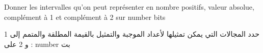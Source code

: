 Donner les intervalles qu'on peut représenter en nombre positifs, valeur absolue, complément à 1 et complément à 2  sur {{number}} bits


\begin{arab}[utf]
حدد المجالات التي يمكن تمثيلها لأعداد الموجبة والتمثيل بالقيمة المطلقة والمتمم إلى 1 و 2 على   : {{number}} بت
\end{arab}
